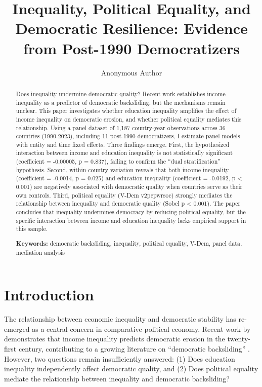 \documentclass[11pt,letterpaper]{article}
\title{Inequality, Political Equality, and Democratic Resilience: Evidence from Post-1990 Democratizers}
\author{Anonymous Author}
\date{}
\begin{document}
\maketitle

\begin{abstract}
Does inequality undermine democratic quality? Recent work establishes income inequality as a predictor of democratic backsliding, but the mechanisms remain unclear. This paper investigates whether education inequality amplifies the effect of income inequality on democratic erosion, and whether political equality mediates this relationship. Using a panel dataset of 1,187 country-year observations across 36 countries (1990-2023), including 11 post-1990 democratizers, I estimate panel models with entity and time fixed effects. Three findings emerge. First, the hypothesized interaction between income and education inequality is not statistically significant (coefficient = -0.00005, p = 0.837), failing to confirm the ``dual stratification'' hypothesis. Second, within-country variation reveals that both income inequality (coefficient = -0.0014, p = 0.025) and education inequality (coefficient = -0.0192, p < 0.001) are negatively associated with democratic quality when countries serve as their own controls. Third, political equality (V-Dem v2pepwrsoc) strongly mediates the relationship between inequality and democratic quality (Sobel p < 0.001). The paper concludes that inequality undermines democracy by reducing political equality, but the specific interaction between income and education inequality lacks empirical support in this sample.

\vspace{0.5cm}
\noindent \textbf{Keywords:} democratic backsliding, inequality, political equality, V-Dem, panel data, mediation analysis
\end{abstract}

\newpage

\section{Introduction}

The relationship between economic inequality and democratic stability has re-emerged as a central concern in comparative political economy. Recent work by \cite{Haggard2024} demonstrates that income inequality predicts democratic erosion in the twenty-first century, contributing to a growing literature on ``democratic backsliding'' \cite{Luhrmann2019}. However, two questions remain insufficiently answered: (1) Does education inequality independently affect democratic quality, and (2) Does political equality mediate the relationship between inequality and democratic backsliding?
\end{document}
